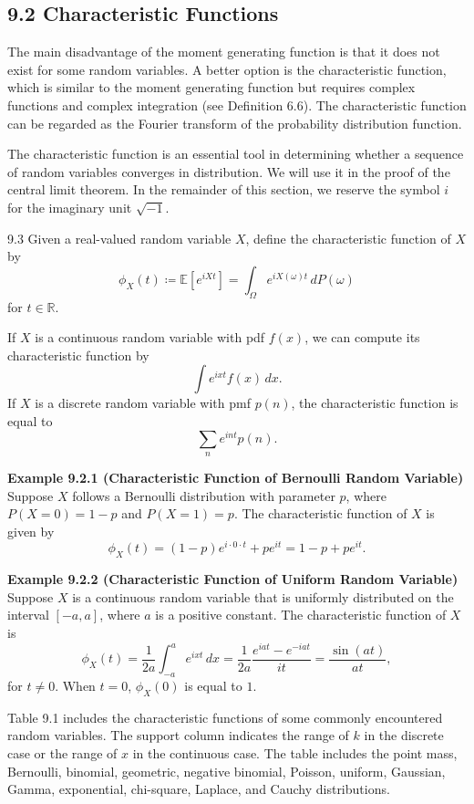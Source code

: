 \subsection*{9.2 Characteristic Functions}

The main disadvantage of the moment generating function is that it does not exist for some random variables. A better option is the characteristic function, which is similar to the moment generating function but requires complex functions and complex integration (see Definition 6.6). The characteristic function can be regarded as the Fourier transform of the probability distribution function.

The characteristic function is an essential tool in determining whether a sequence of random variables converges in distribution. We will use it in the proof of the central limit theorem. In the remainder of this section, we reserve the symbol $i$ for the imaginary unit $\sqrt{-1}$.

\begin{defbox}{9.3}
Given a real-valued random variable $X$, define the characteristic function of $X$ by
\[
\phi_X(t) \coloneqq \mathbb{E}[e^{iXt}]
= \int_{\Omega} e^{iX(\omega)t}\,dP(\omega)
\]
for $t\in\mathbb{R}$.

If $X$ is a continuous random variable with pdf $f(x)$, we can compute its characteristic function by
\[
\int e^{ixt}f(x)\,dx.
\]
If $X$ is a discrete random variable with pmf $p(n)$, the characteristic function is equal to
\[
\sum_n e^{int}p(n).
\]
\end{defbox}

\textbf{Example 9.2.1 (Characteristic Function of Bernoulli Random Variable)} \\
Suppose $X$ follows a Bernoulli distribution with parameter $p$, where $P(X=0)=1-p$ and $P(X=1)=p$. The characteristic function of $X$ is given by
\[
\phi_X(t) = (1-p)e^{i\cdot 0\cdot t}+pe^{it}=1-p+pe^{it}.
\]

\textbf{Example 9.2.2 (Characteristic Function of Uniform Random Variable)} \\
Suppose $X$ is a continuous random variable that is uniformly distributed on the interval $[-a,a]$, where $a$ is a positive constant. The characteristic function of $X$ is
\[
\phi_X(t)=\frac{1}{2a}\int_{-a}^{a} e^{ixt}\,dx
=\frac{1}{2a}\frac{e^{iat}-e^{-iat}}{it}
=\frac{\sin(at)}{at},
\]
for $t\neq 0$. When $t=0$, $\phi_X(0)$ is equal to $1$.

Table 9.1 includes the characteristic functions of some commonly encountered random variables. The support column indicates the range of $k$ in the discrete case or the range of $x$ in the continuous case. The table includes the point mass, Bernoulli, binomial, geometric, negative binomial, Poisson, uniform, Gaussian, Gamma, exponential, chi-square, Laplace, and Cauchy distributions.

